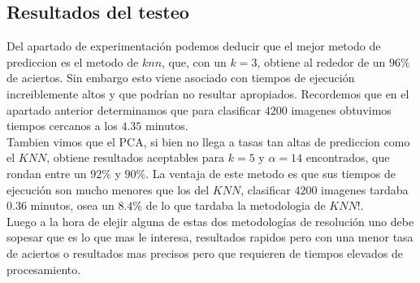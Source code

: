 \subsection{Resultados del testeo}
Del apartado de experimentación podemos deducir que el mejor metodo de prediccion es el metodo de $knn$, que, con un $k=3$, obtiene al rededor de un $96 \%$ de aciertos. Sin embargo esto viene asociado con tiempos de ejecución increiblemente altos y que podrían no resultar apropiados. Recordemos que en el apartado anterior determinamos que para clasificar $4200$ imagenes obtuvimos tiempos cercanos a los $4.35$ minutos.
\\
Tambien vimos que el PCA, si bien no llega a tasas tan altas de prediccion como el $KNN$, obtiene resultados aceptables para $k = 5$ y $\alpha = 14$ encontrados, que rondan entre un $92 \%$ y $90 \%$. La ventaja de este metodo es que sus tiempos de ejecución son mucho menores que los del $KNN$, clasificar $4200$ imagenes tardaba $0.36$ minutos, osea un $8.4 \%$ de lo que tardaba la metodologia de $KNN$!. 
\\
Luego a la hora de elejir alguna de estas dos metodologías de resolución uno debe sopesar que es lo que mas le interesa, resultados rapidos pero con una menor tasa de aciertos o resultados mas precisos pero que requieren de tiempos elevados de procesamiento.
